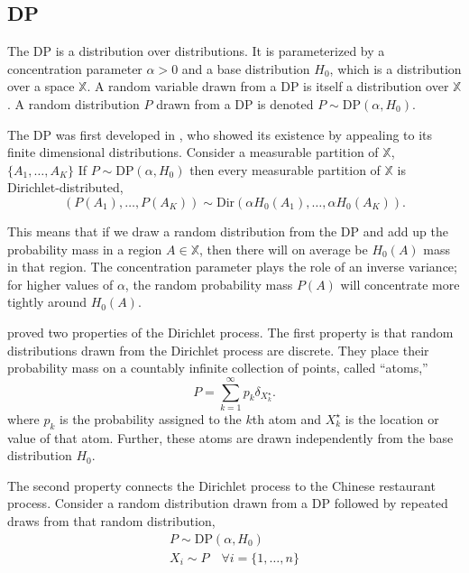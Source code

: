 \subsection{\acrlong{DP}} \label{DP}

The \acrfull{DP} is a distribution over distributions. It is parameterized by a concentration parameter $\alpha > 0$ and a base distribution $H_0$, which is a distribution over a space $\mathbb{X}$. A random variable drawn from a \gls{DP} is itself a distribution over $\mathbb{X}$. A random distribution $P$ drawn from a \gls{DP} is denoted $P \sim \text{DP}(\alpha, H_0)$.

The \gls{DP} was first developed in \cite{ferguson73}, who showed its existence by appealing to its finite dimensional distributions. Consider a measurable partition of $\mathbb{X}$, $\{A_1,\dots,A_K\}$ If $P \sim \text{DP}(\alpha, H_0)$ then every measurable partition of $\mathbb{X}$ is Dirichlet-distributed,
$$(P(A_1), \dots , P(A_K)) \sim \text{Dir}(\alpha H_0(A_1), \dots , \alpha H_0(A_K)).$$

This means that if we draw a random distribution from the \gls{DP} and add up the probability mass in a region $A \in \mathbb{X}$, then there will on average be $H_0(A)$ mass in that region. The concentration parameter plays the role of an inverse variance; for higher values of $\alpha$, the random probability mass $P(A)$ will concentrate more tightly around $H_0(A)$.

\cite{ferguson73} proved two properties of the Dirichlet process. The first property is that random distributions drawn from the Dirichlet process are discrete. They place their probability mass on a countably infinite collection of points, called “atoms,”
\begin{equation} \label{eq:DP}
P = \sum_{k=1}^\infty{p_k \delta_{X_k^\star}}.
\end{equation}
where $p_k$ is the probability assigned to the $k$th atom and $X_k^\star$ is the location or value of that atom. Further, these atoms are drawn independently from the base distribution $H_0$.

The second property connects the Dirichlet process to the Chinese restaurant process. Consider a random distribution drawn from a DP followed by repeated draws from that random distribution,
\begin{gather}
P \sim \text{DP}(\alpha, H_0) \\
X_i \sim P \quad \forall i= \{1,\dots,n\} \label{eq:CRP}
\end{gather}

